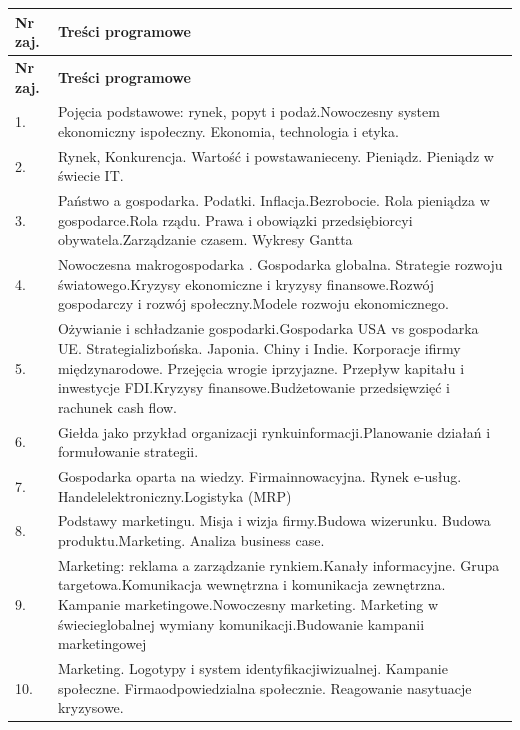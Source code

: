 \documentclass[12pt, a4paper]{article}
\newcommand{\thdrule}{\noalign{\global\setlength{\extrarowheight}{0pt}}}
\newcommand{\thdend}{\noalign{\global\setlength{\extrarowheight}{3pt}}}
\begin{document}
{\scriptsize
\begin{longtable}{m{1.5cm}m{14.5cm}}
\thdrule\toprule
\rowcolor{pjatkRed} {\color{white}\textbf{Nr zaj.}} & {\color{white}\textbf{Treści programowe}} \\
\midrule\thdend
\endfirsthead
\thdrule\toprule
\rowcolor{pjatkRed} {\color{white}\textbf{Nr zaj.}} & {\color{white}\textbf{Treści programowe}} \\
\midrule\thdend
\endhead
  \rowcolor{tableRowLight} 1. & Pojęcia podstawowe: rynek, popyt i podaż.Nowoczesny system ekonomiczny ispołeczny. Ekonomia, technologia i etyka. \\
  \rowcolor{tableRowAlt} 2. & Rynek, Konkurencja. Wartość i powstawanieceny. Pieniądz. Pieniądz w świecie IT. \\
  \rowcolor{tableRowLight} 3. & Państwo a gospodarka. Podatki. Inflacja.Bezrobocie. Rola pieniądza w gospodarce.Rola rządu. Prawa i obowiązki przedsiębiorcyi obywatela.Zarządzanie czasem. Wykresy Gantta \\
  \rowcolor{tableRowAlt} 4. & Nowoczesna makrogospodarka . Gospodarka globalna. Strategie rozwoju światowego.Kryzysy ekonomiczne i kryzysy finansowe.Rozwój gospodarczy i rozwój społeczny.Modele rozwoju ekonomicznego. \\
  \rowcolor{tableRowLight} 5. & Ożywianie i schładzanie gospodarki.Gospodarka USA vs gospodarka UE. Strategializbońska. Japonia. Chiny i Indie. Korporacje ifirmy międzynarodowe. Przejęcia wrogie iprzyjazne. Przepływ kapitału i inwestycje FDI.Kryzysy finansowe.Budżetowanie przedsięwzięć i rachunek cash flow. \\
  \rowcolor{tableRowAlt} 6. & Giełda jako przykład organizacji rynkuinformacji.Planowanie działań i formułowanie strategii. \\
  \rowcolor{tableRowLight} 7. & Gospodarka oparta na wiedzy. Firmainnowacyjna. Rynek e-usług. Handelelektroniczny.Logistyka (MRP) \\
  \rowcolor{tableRowAlt} 8. & Podstawy marketingu. Misja i wizja firmy.Budowa wizerunku. Budowa produktu.Marketing. Analiza business case. \\
  \rowcolor{tableRowLight} 9. & Marketing: reklama a zarządzanie rynkiem.Kanały informacyjne. Grupa targetowa.Komunikacja wewnętrzna i komunikacja zewnętrzna. Kampanie marketingowe.Nowoczesny marketing. Marketing w świecieglobalnej wymiany komunikacji.Budowanie kampanii marketingowej \\
  \rowcolor{tableRowAlt} 10. & Marketing. Logotypy i system identyfikacjiwizualnej. Kampanie społeczne. Firmaodpowiedzialna społecznie. Reagowanie nasytuacje kryzysowe. \\

\end{longtable}}
\end{document}
